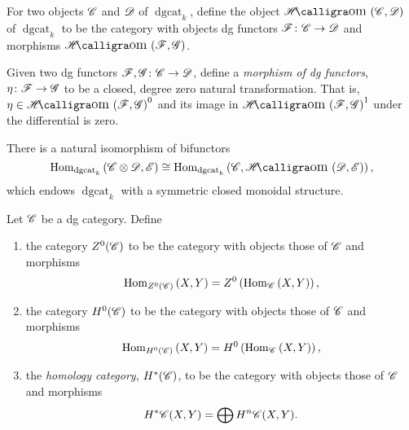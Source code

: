 \documentclass[dissertation.tex]{subfiles}
\begin{document}
\begin{defn}
  For two objects $\mathscr{C}$ and $\mathscr{D}$ of $\operatorname{dgcat}_k$, define the object $\SHom{\CC,\D}$ of $\operatorname{dgcat}_k$ to be the category with objects dg functors $\mathscr{F} \colon \mathscr{C} \rightarrow \mathscr{D}$ and morphisms $\SHom{\mathscr{F},\mathscr{G}}$.
  
  Given two dg functors $\mathscr{F},\mathscr{G} \colon \mathscr{C} \rightarrow \mathscr{D}$, define a {\it morphism of dg functors}, $\eta \colon \mathscr{F} \rightarrow \mathscr{G}$ to be a closed, degree zero natural transformation.
  That is, $\eta \in \SHom{\F, \G}^0$ and its image in $\SHom{\F,\G}^1$ under the differential is zero.
\end{defn}

\begin{rmk}
  There is a natural isomorphism of bifunctors
  $$\Hom{\operatorname{dgcat}_k}{\CC \otimes \D, \mathscr{E}} \cong \Hom{\operatorname{dgcat}_k}{\CC, \SHom{\D,\mathscr{E}}},$$
  which endows $\operatorname{dgcat}_k$ with a symmetric closed monoidal structure.
\end{rmk}

\begin{defn}
  Let $\mathscr{C}$ be a dg category.
  Define
  \begin{enumerate}
  \item
    the category $Z^0(\mathscr{C})$ to be the category with objects those of $\mathscr{C}$ and morphisms
    $$\operatorname{Hom}_{Z^0(\mathscr{C})}\left(X,Y\right) = Z^0\left(\operatorname{Hom}_{\mathscr{C}}\left(X,Y\right)\right),$$
  \item
    the category $H^0(\mathscr{C})$ to be the category with objects those of $\mathscr{C}$ and morphisms
    $$\operatorname{Hom}_{H^0(\mathscr{C})}\left(X,Y\right) = H^0\left(\operatorname{Hom}_{\mathscr{C}}\left(X,Y\right)\right),$$
  \item
    the {\it homology category}, $H^\ast(\mathscr{C})$, to be the category with objects those of $\mathscr{C}$ and morphisms 
    $$H^\ast\mathscr{C}(X,Y) = \bigoplus H^n\mathscr{C}(X,Y).$$
  \end{enumerate}
\end{defn}
\end{document}
